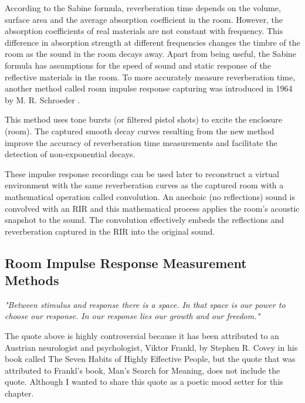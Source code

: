             According to the Sabine formula, reverberation time depends on the volume, surface area and the average absorption coefficient in the room. However, the absorption coefficients of real materials are not constant with frequency. This difference in absorption strength at different frequencies changes the timbre of the room as the sound in the room decays away. Apart from being useful, the Sabine formula has assumptions for the speed of sound and static response of the reflective materials in the room. To more accurately measure reverberation time, another method called room impulse response capturing was introduced in 1964 by M. R. Schroeder \cite{New_Method_Measuring_RT}.\par

            This method uses tone bursts (or filtered pistol shots) to excite the enclosure (room). The captured smooth decay curves resulting from the new method improve the accuracy of reverberation time measurements and facilitate the detection of non-exponential decays\cite{New_Method_Measuring_RT}.\par

            These impulse response recordings can be used later to reconstruct a virtual environment with the same reverberation curves as the captured room with a mathematical operation called convolution. An anechoic (no reflections) sound is convolved with an RIR and this mathematical process applies the room's acoustic snapshot to the sound. The convolution effectively embeds the reflections and reverberation captured in the RIR into the original sound.\par
        \subsection{Room Impulse Response Measurement Methods}
            \emph{"Between stimulus and response there is a space. In that space is our power to choose our response. In our response lies our growth and our freedom."\cite{Sonic_Interaction_in_Virtual_Environments}}

            The quote above is highly controversial because it has been attributed to an Austrian neurologist and psychologist, Viktor Frankl, by Stephen R. Covey in his book called The Seven Habits of Highly Effective People, but the quote that was attributed to Frankl's book, Man's Search for Meaning, does not include the quote. Although I wanted to share this quote as a poetic mood setter for this chapter.\par

